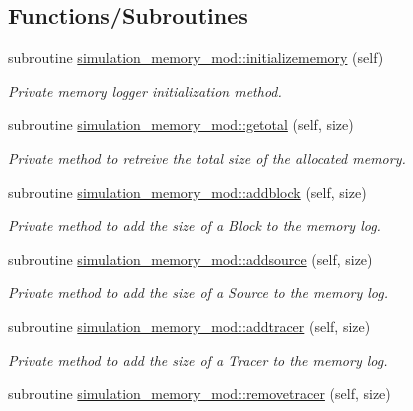 \subsection*{Functions/\+Subroutines}
\begin{DoxyCompactItemize}
\item 
subroutine \hyperlink{namespacesimulation__memory__mod_ac8306165e4ec88fec9a2b8b719f61893}{simulation\+\_\+memory\+\_\+mod\+::initializememory} (self)
\begin{DoxyCompactList}\small\item\em Private memory logger initialization method. \end{DoxyCompactList}\item 
subroutine \hyperlink{namespacesimulation__memory__mod_acf04d6b930ed3ffbc0950afd86033c51}{simulation\+\_\+memory\+\_\+mod\+::getotal} (self, size)
\begin{DoxyCompactList}\small\item\em Private method to retreive the total size of the allocated memory. \end{DoxyCompactList}\item 
subroutine \hyperlink{namespacesimulation__memory__mod_a4169689db37b3ba35e092096a7019f80}{simulation\+\_\+memory\+\_\+mod\+::addblock} (self, size)
\begin{DoxyCompactList}\small\item\em Private method to add the size of a Block to the memory log. \end{DoxyCompactList}\item 
subroutine \hyperlink{namespacesimulation__memory__mod_a940ff42fa3a49423f9ac98da2bffa54c}{simulation\+\_\+memory\+\_\+mod\+::addsource} (self, size)
\begin{DoxyCompactList}\small\item\em Private method to add the size of a Source to the memory log. \end{DoxyCompactList}\item 
subroutine \hyperlink{namespacesimulation__memory__mod_a5770021491589bbd61ea112d113a9c9d}{simulation\+\_\+memory\+\_\+mod\+::addtracer} (self, size)
\begin{DoxyCompactList}\small\item\em Private method to add the size of a Tracer to the memory log. \end{DoxyCompactList}\item 
subroutine \hyperlink{namespacesimulation__memory__mod_a5f95539e9740401e7046b79c40ad2ecd}{simulation\+\_\+memory\+\_\+mod\+::removetracer} (self, size)

\end{DoxyCompactItemize}
